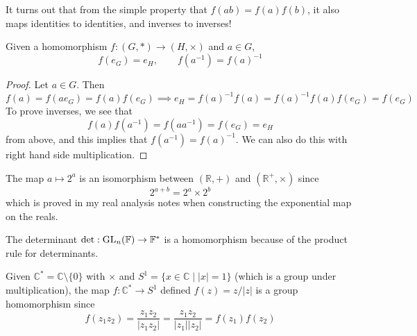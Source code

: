   It turns out that from the simple property that $f(ab) = f(a) f(b)$, it also maps identities to identities, and inverses to inverses!  

  \begin{lemma}
    Given a homomorphism $f: (G, \ast) \rightarrow (H, \times)$ and $a \in G$, 
    \begin{equation}
      f(e_G) = e_H, \qquad f(a^{-1}) = f(a)^{-1}
    \end{equation}
  \end{lemma}
  \begin{proof}
    Let $a \in G$. Then 
    \begin{equation}
      f(a) = f(a e_G) = f(a) f(e_G) \implies e_H = f(a)^{-1} f(a) = f(a)^{-1} f(a) f(e_G) = f(e_G)
    \end{equation}
    To prove inverses, we see that 
    \begin{equation}
      f(a) f(a^{-1}) = f(a a^{-1}) = f(e_G) = e_H
    \end{equation}
    from above, and this implies that $f(a^{-1}) = f(a)^{-1}$. We can also do this with right hand side multiplication. 
  \end{proof}

  \begin{example}
    The map $a \mapsto 2^{a}$ is an isomorphism between $(\mathbb{R}, +)$ and $(\mathbb{R}^{+}, \times)$ since 
    \begin{equation}
      2^{a+b} = 2^a \times 2^b
    \end{equation} 
    which is proved in my real analysis notes when constructing the exponential map on the reals. 
  \end{example} 

  \begin{example}[Determinant]
    The determinant $\det: \GL_n (\mathbb{F}) \rightarrow \mathbb{F}^\ast$ is a homomorphism because of the product rule for determinants. 
  \end{example}

  \begin{example}
    Given $\mathbb{C}^\ast = \mathbb{C} \setminus \{0\}$ with $\times$ and $S^1 = \{x \in \mathbb{C} \mid |x| = 1\}$ (which is a group under multiplication), the map $f: \mathbb{C}^\ast \rightarrow S^1$ defined $f(z) = z/|z|$ is a group homomorphism since 
    \begin{equation}
      f(z_1 z_2) = \frac{z_1 z_2}{|z_1 z_2|} = \frac{z_1 z_2}{|z_1| |z_2|} = f(z_1) f(z_2)
    \end{equation}
  \end{example} 

